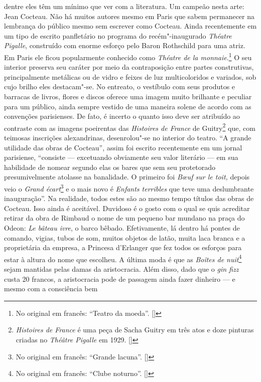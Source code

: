 dentre eles têm um mínimo que ver com a literatura. Um campeão nesta
arte: Jean Cocteau. Não há muitos autores mesmo em Paris que sabem
permanecer na lembrança do público mesmo sem escrever como Cocteau.
Ainda recentemente em um tipo de escrito panfletário no programa do
recém"-inaugurado \emph{Théatre Pigalle}, construído com enorme esforço
pelo Baron Rothschild para uma atriz. Em Paris ele ficou popularmente
conhecido como \emph{Théatre de la monnaie}.\footnote{No original
  em francês: ``Teatro da moeda''. []} O seu interior preserva seu caráter
por meio da contraposição entre partes construtivas, principalmente
metálicas ou de vidro e feixes de luz multicoloridos e variados, sob
cujo brilho eles destacam"-se. No entreato, o vestíbulo com seus produtos
e barracas de livros, flores e discos oferece uma imagem muito brilhante
e peculiar para um público, ainda sempre vestido de uma maneira solene
de acordo com as convenções parisienses. De fato, é incerto o quanto
isso deve ser atribuído ao contraste com as imagens poeirentas das
\emph{Histoires de France} de Guitry\footnote{\emph{Histoires de
  France} é uma peça de Sacha Guitry em três atos e doze pinturas
  criadas no \emph{Théâtre Pigalle} em 1929. []} que, com teimosas
inscrições alexandrinas, desenrolou"-se no interior do teatro. ``A grande
utilidade das obras de Cocteau'', assim foi escrito recentemente em um
jornal parisiense, ``consiste --- excetuando obviamente seu valor
literário --- em sua habilidade de nomear segundo elas os bares que sem
seu protetorado presumivelmente atolasse na banalidade. O primeiro foi
\emph{Bœuf sur le toit,} depois veio o \emph{Grand écart}\footnote{No original em francês: ``Grande lacuna''. []} e o mais novo é
\emph{Enfants terribles} que teve uma deslumbrante inauguração''. Na
realidade, todos estes são ao mesmo tempo títulos das obras de Cocteau.
Isso ainda é aceitável. Duvidoso é o gosto com o qual se quis acreditar
retirar da obra de Rimbaud o nome de um pequeno bar mundano na praça do
Odeon: \emph{Le bâteau ivre}, o barco bêbado. Efetivamente, lá dentro há
pontes de comando, vigias, tubos de som, muitos objetos de latão, muita
laca branca e a proprietária da empresa, a Princesa d'Erlanger que fez
todos os esforços para estar à altura do nome que escolheu. A última
moda é que as \emph{Boîtes de nuit}\footnote{No original em
  francês: ``Clube noturno''. []} sejam mantidas pelas damas da aristocracia.
Além disso, dado que o \emph{gin fizz} custa 20 francos, a aristocracia
pode de passagem ainda fazer dinheiro --- e mesmo com a consciência bem
